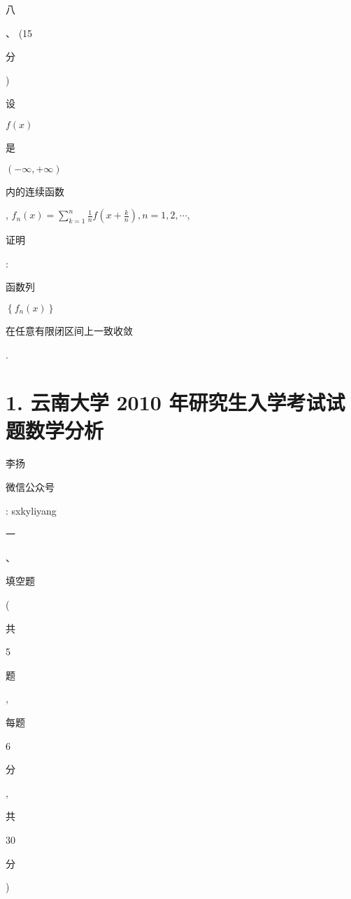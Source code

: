 \documentclass[10pt]{article}
\begin{document}
\begin{CJK}{UTF8}{mj}八\end{CJK}、 (15 \begin{CJK}{UTF8}{mj}分\end{CJK}) \begin{CJK}{UTF8}{mj}设\end{CJK} $f(x)$ \begin{CJK}{UTF8}{mj}是\end{CJK} $(-\infty,+\infty)$ \begin{CJK}{UTF8}{mj}内的连续函数\end{CJK}, $f_{n}(x)=\sum_{k=1}^{n} \frac{1}{n} f\left(x+\frac{k}{n}\right), n=1,2, \cdots$, \begin{CJK}{UTF8}{mj}证明\end{CJK}: \begin{CJK}{UTF8}{mj}函数列\end{CJK} $\left\{f_{n}(x)\right\}$ \begin{CJK}{UTF8}{mj}在任意有限闭区间上一致收敛\end{CJK}.

\section{1. 云南大学 2010 年研究生入学考试试题数学分析}
\begin{CJK}{UTF8}{mj}李扬\end{CJK}

\begin{CJK}{UTF8}{mj}微信公众号\end{CJK}: sxkyliyang

\begin{CJK}{UTF8}{mj}一\end{CJK}、\begin{CJK}{UTF8}{mj}填空题\end{CJK} (\begin{CJK}{UTF8}{mj}共\end{CJK} 5 \begin{CJK}{UTF8}{mj}题\end{CJK}, \begin{CJK}{UTF8}{mj}每题\end{CJK} 6 \begin{CJK}{UTF8}{mj}分\end{CJK}, \begin{CJK}{UTF8}{mj}共\end{CJK} 30 \begin{CJK}{UTF8}{mj}分\end{CJK})
\end{document}
